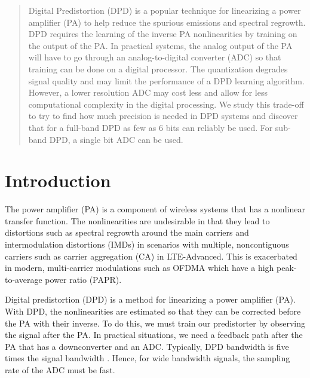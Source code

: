 \documentclass[conference]{IEEEtran}
\begin{document}
\begin{abstract}
Digital Predistortion (DPD) is a popular technique for linearizing a power amplifier (PA) to help reduce the spurious emissions and spectral regrowth. DPD requires the learning of the inverse PA nonlinearities by training on the output of the PA. In practical systems, the analog output of the PA will have to go through an analog-to-digital converter (ADC) so that training can be done on a digital processor. The quantization degrades signal quality and may limit the performance of a DPD learning algorithm. However, a lower resolution ADC may cost less and allow for less computational complexity in the digital processing. 
We study this trade-off to try to find how much precision is needed in DPD systems and discover that for a full-band DPD as few as 6 bits can reliably be used. 
For sub-band DPD, a single bit ADC can be used. 
\end{abstract}






%


\section{Introduction}
The power amplifier (PA) is a component of wireless systems that has a nonlinear transfer function. 
The nonlinearities are undesirable in that they lead to distortions such as spectral regrowth around the main carriers and intermodulation distortions (IMDs) in scenarios with multiple, noncontiguous carriers such as carrier aggregation (CA) in LTE-Advanced. 
This is exacerbated in modern, multi-carrier modulations such as OFDMA which have a high peak-to-average power ratio (PAPR). 

Digital predistortion (DPD) is a method for linearizing a power amplifier (PA). 
With DPD, the nonlinearities are estimated so that they can be corrected before the PA with their inverse.
To do this, we must train our predistorter by observing the signal after the PA.
In practical situations, we need a feedback path after the PA that has a downconverter and an ADC.
Typically, DPD bandwidth is five times the signal bandwidth  \cite{Katz2016}. Hence, for wide bandwidth signals, the sampling rate of the ADC must be fast. 
\end{document}
